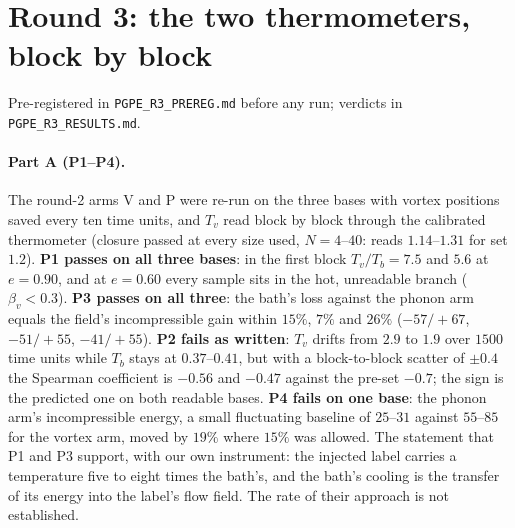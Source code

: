 \documentclass[11pt,a4paper]{article}
\begin{document}
\section{Round 3: the two thermometers, block by block}\label{sec:round3}

Pre-registered in \texttt{PGPE\_R3\_PREREG.md} before any run; verdicts in \texttt{PGPE\_R3\_RESULTS.md}.

\paragraph{Part A (P1--P4).} The round-2 arms V and P were re-run on the three bases with vortex positions saved
every ten time units, and $T_v$ read block by block through the calibrated thermometer (closure passed at every size
used, $N=4$--$40$: reads $1.14$--$1.31$ for set $1.2$). \textbf{P1 passes on all three bases}: in the first block
$T_v/T_b=7.5$ and $5.6$ at $e=0.90$, and at $e=0.60$ every sample sits in the hot, unreadable branch
($\beta_v<0.3$). \textbf{P3 passes on all three}: the bath's loss against the phonon arm equals the field's
incompressible gain within $15\%$, $7\%$ and $26\%$ ($-57/+67$, $-51/+55$, $-41/+55$). \textbf{P2 fails as
written}: $T_v$ drifts from $2.9$ to $1.9$ over $1500$ time units while $T_b$ stays at $0.37$--$0.41$, but with a
block-to-block scatter of $\pm0.4$ the Spearman coefficient is $-0.56$ and $-0.47$ against the pre-set $-0.7$; the
sign is the predicted one on both readable bases. \textbf{P4 fails on one base}: the phonon arm's incompressible
energy, a small fluctuating baseline of $25$--$31$ against $55$--$85$ for the vortex arm, moved by $19\%$ where
$15\%$ was allowed. The statement that P1 and P3 support, with our own instrument: the injected label carries a
temperature five to eight times the bath's, and the bath's cooling is the transfer of its energy into the label's
flow field. The rate of their approach is not established.
\end{document}
